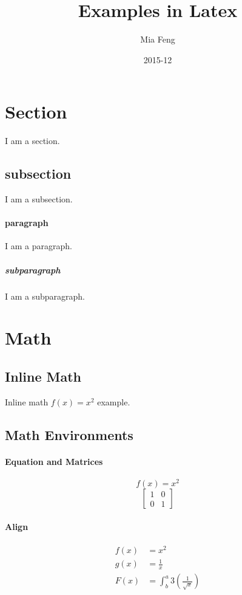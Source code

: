 \documentclass{article}
\title{Examples in Latex}
\date{2015-12}
\author{Mia Feng}
\begin{document}
	\maketitle
	\tableofcontents
	\newpage
	
	\section{Section}
	I am a section.
	\subsection{subsection}
	I am a subsection.
	\paragraph{paragraph}
	I am a paragraph.
	\subparagraph{subparagraph}
	I am a subparagraph.
	
	\section{Math}
	\subsection{Inline Math}
	Inline math $f(x) = x^2$ example.
	\subsection{Math Environments}
	\paragraph{Equation and Matrices}
	\begin{equation*}
		f(x) = x^2
	\end{equation*}
	\begin{equation}
		\left[
		\begin{matrix}
		1 & 0\\
		0 & 1
		\end{matrix}
		\right]
	\end{equation}
	
	\paragraph{Align}
	\begin{align*}
		f(x) &= x^2\\
		g(x) &= \frac{1}{x}\\
		F(x) &= \int^a_b 3\left(\frac{1}{\sqrt{x}}\right)
	\end{align*}
	
\end{document}
